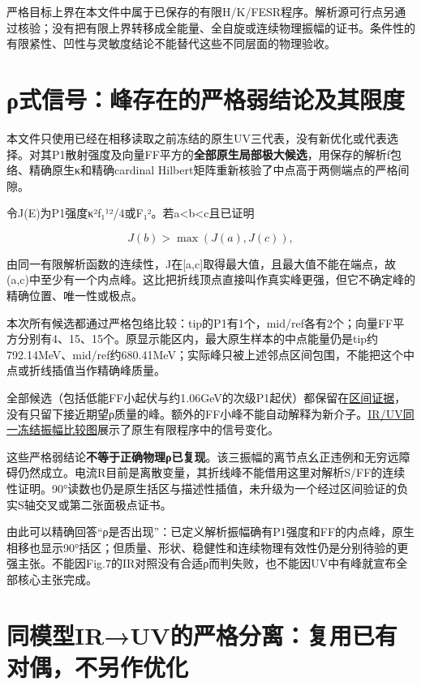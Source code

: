 \documentclass[
  10pt,
  a4paper,
]{article}
\begin{document}
严格目标上界在本文件中属于已保存的有限H/K/FESR程序。解析源可行点另通过核验；没有把有限上界转移成全能量、全自旋或连续物理振幅的证书。条件性的有限紧性、凹性与灵敏度结论不能替代这些不同层面的物理验收。

\newpage

\section{ρ式信号：峰存在的严格弱结论及其限度}\label{ux3c1ux5f0fux4fe1ux53f7ux5cf0ux5b58ux5728ux7684ux4e25ux683cux5f31ux7ed3ux8bbaux53caux5176ux9650ux5ea6}

本文件只使用已经在相移读取之前冻结的原生UV三代表，没有新优化或代表选择。对其P1散射强度及向量FF平方的\textbf{全部原生局部极大候选}，用保存的解析f包络、精确原生κ和精确cardinal
Hilbert矩阵重新核验了中点高于两侧端点的严格间隙。

令J(E)为P1强度κ²\textbar f₁¹\textbar²/4或\textbar F₁\textbar²。若a\textless b\textless c且已证明

\[
J(b)>\max(J(a),J(c)),
\]

由同一有限解析函数的连续性，J在{[}a,c{]}取得最大值，且最大值不能在端点，故(a,c)中至少有一个内点峰。这比把折线顶点直接叫作真实峰更强，但它不确定峰的精确位置、唯一性或极点。

本次所有候选都通过严格包络比较：tip的P1有1个，mid/ref各有2个；向量FF平方分别有4、15、15个。原显示能区内，最大原生样本的中点能量仍是tip约792.14MeV、mid/ref约680.41MeV；实际峰只被上述邻点区间包围，不能把这个中点或折线插值当作精确峰质量。

全部候选（包括低能FF小起伏与约1.06GeV的次级P1起伏）都保留在\href{../RHO_SIGNAL_PEAK_EXISTENCE.json}{区间证据}，没有只留下接近期望ρ质量的峰。额外的FF小峰不能自动解释为新介子。\href{../../sequential_reproduction_20260910/CE_native_comparison/rho_mechanism.pdf}{IR/UV同一冻结振幅比较图}展示了原生有限程序中的信号变化。

这些严格弱结论\textbf{不等于正确物理ρ已复现}。该三振幅的离节点幺正违例和无穷远障碍仍然成立。电流R目前是离散变量，其折线峰不能借用这里对解析S/FF的连续性证明。90°读数也仍是原生括区与描述性插值，未升级为一个经过区间验证的负实S轴交叉或第二张面极点证书。

由此可以精确回答``ρ是否出现''：已定义解析振幅确有P1强度和FF的内点峰，原生相移也显示90°括区；但质量、形状、稳健性和连续物理有效性仍是分别待验的更强主张。不能因Fig.7的IR对照没有合适ρ而判失败，也不能因UV中有峰就宣布全部核心主张完成。

\newpage

\section{同模型IR→UV的严格分离：复用已有对偶，不另作优化}\label{ux540cux6a21ux578biruvux7684ux4e25ux683cux5206ux79bbux590dux7528ux5df2ux6709ux5bf9ux5076ux4e0dux53e6ux4f5cux4f18ux5316}
\end{document}
